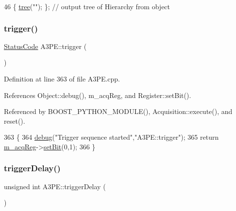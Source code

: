 \begin{DoxyCode}
46 \{ \hyperlink{classHierarchy_a594c294c5f60c230e106d522ed008212}{tree}(\textcolor{stringliteral}{""}); \};                     \textcolor{comment}{// output tree of Hierarchy from object}
\end{DoxyCode}
\mbox{\label{classA3PE_a75cd0377eb653ed22c4d258ab359f3d6}} 
\subsubsection{\texorpdfstring{trigger()}{trigger()}}
{\footnotesize\ttfamily \hyperlink{classStatusCode}{Status\+Code} A3\+P\+E\+::trigger (\begin{DoxyParamCaption}{ }\end{DoxyParamCaption})}



Definition at line 363 of file A3\+P\+E.\+cpp.



References Object\+::debug(), m\+\_\+acq\+Reg, and Register\+::set\+Bit().



Referenced by B\+O\+O\+S\+T\+\_\+\+P\+Y\+T\+H\+O\+N\+\_\+\+M\+O\+D\+U\+L\+E(), Acquisition\+::execute(), and reset().


\begin{DoxyCode}
363                         \{
364   \hyperlink{classObject_aac010553f022165573714b7014a15f0d}{debug}(\textcolor{stringliteral}{"Trigger sequence started"},\textcolor{stringliteral}{"A3PE::trigger"});
365   \textcolor{keywordflow}{return} \hyperlink{classA3PE_abaf426f4c9192537117b77f9f4821e04}{m\_acqReg}->\hyperlink{classRegister_ab094246dd12aa7e0aa0ca917f4e70b31}{setBit}(0,1);
366 \}
\end{DoxyCode}
\mbox{\label{classA3PE_ac0aabc1457923b7ee7da0a2c91c46451}} 
\subsubsection{\texorpdfstring{trigger\+Delay()}{triggerDelay()}}
{\footnotesize\ttfamily unsigned int A3\+P\+E\+::trigger\+Delay (\begin{DoxyParamCaption}{ }\end{DoxyParamCaption})}



